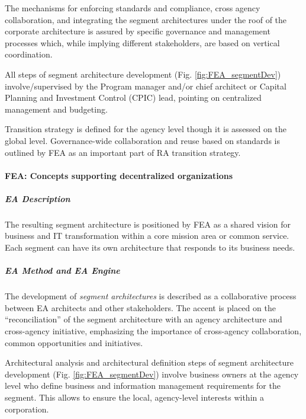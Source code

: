 The mechanisms for enforcing standards and compliance, cross agency collaboration, and integrating the segment architectures under the roof of the corporate architecture is  assured by specific governance and management processes which, while implying different stakeholders, are based on vertical coordination. 


All steps of segment architecture development (Fig. \ref{fig:FEA_segmentDev}) involve/supervised by the Program manager and/or chief architect or Capital Planning and Investment Control (CPIC) lead, pointing on centralized management and budgeting.

Transition strategy is defined for the agency level though it is assessed on the global level. Governance-wide collaboration and reuse based on standards is outlined by FEA as an important part of RA transition strategy.

\paragraph*{FEA: Concepts supporting decentralized organizations}
\subparagraph*{EA Description}

The resulting segment architecture is positioned by FEA as a shared vision for business and IT transformation within a core mission area or common service. Each segment can have its own architecture that responds to its business needs.

\subparagraph*{EA Method and EA Engine}

The development of \textit{segment architectures} is described as a collaborative process between EA architects and other stakeholders. The accent is placed on the ``reconciliation'' of the segment architecture with an agency architecture and cross-agency initiative, emphasizing the importance of  cross-agency collaboration, common opportunities and initiatives.

Architectural analysis and architectural definition steps of segment architecture development (Fig. \ref{fig:FEA_segmentDev}) involve business owners at the agency level who define business and information management requirements for the segment. This allows to ensure the local, agency-level interests within a corporation. 

